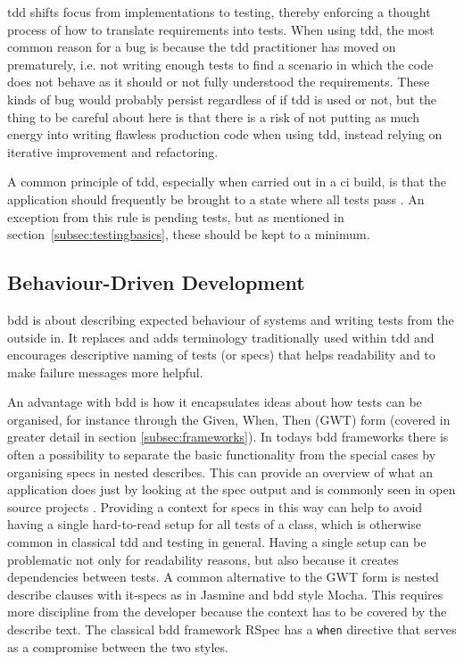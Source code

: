\documentclass[11pt]{article}
\begin{document}
\gls{tdd} shifts focus from implementations to testing, thereby enforcing a thought process of how to translate requirements into tests. When using \gls{tdd}, the most common reason for a bug is because the \gls{tdd} practitioner has moved on prematurely, i.e. not writing enough tests to find a scenario in which the code does not behave as it should or not fully understood the requirements. These kinds of bug would probably persist regardless of if \gls{tdd} is used or not, but the thing to be careful about here is that there is a risk of not putting as much energy into writing flawless production code when using \gls{tdd}, instead relying on iterative improvement and refactoring. %

A common principle of \gls{tdd}, especially when carried out in a \gls{ci} build, is that the application should frequently be brought to a state where all tests pass \cite[question~2]{Rovegard}. An exception from this rule is pending tests, but as mentioned in section~\ref{subsec:testingbasics}, these should be kept to a minimum.

\subsection{Behaviour-Driven Development}
\label{subsec:bdd}

\acrfull{bdd} is about describing expected behaviour of systems and writing tests from the outside in. It replaces and adds terminology traditionally used within \gls{tdd} and encourages descriptive naming of tests (or \glspl{spec}) that helps readability and to make failure messages more helpful. \cite[questions~17-18]{Ahnve}

An advantage with \gls{bdd} is how it encapsulates ideas about how tests can be organised, for instance through the Given, When, Then (GWT) form (covered in greater detail in section \ref{subsec:frameworks}). In todays \gls{bdd} frameworks there is often a possibility to separate the basic functionality from the special cases by organising \glspl{spec} in nested describes. This can provide an overview of what an application does just by looking at the \gls{spec} output and is commonly seen in open source projects \cite[question~42]{Stenmark}. Providing a context for \glspl{spec} in this way can help to avoid having a single hard-to-read setup for all tests of a class, which is otherwise common in classical \gls{tdd} and testing in general. Having a single setup can be problematic not only for readability reasons, but also because it creates dependencies between tests. A common alternative to the GWT form is nested describe clauses with it-specs as in Jasmine and \gls{bdd} style Mocha. This requires more discipline from the developer because the context has to be covered by the describe text. The classical \gls{bdd} framework RSpec has a \texttt{when} directive that serves as a compromise between the two styles. \cite[question~19]{Ahnve}
\end{document}
